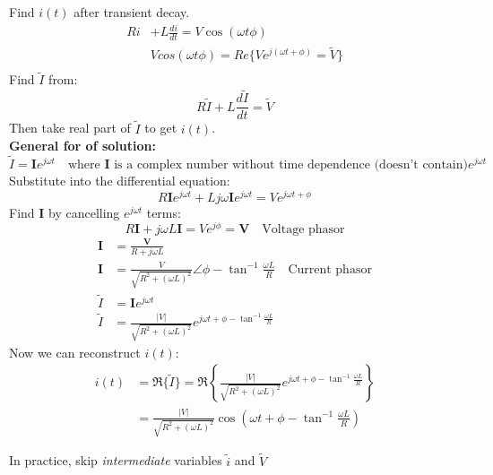 \begin{example}
    Find $i(t)$ after transient decay.\\
    \begin{align}
        Ri & + L\frac{di}{dt}= V \cos(\omega t \phi)                           \\
           & Vcos(\omega t \phi) = Re{\{Ve^{j(\omega t + \phi)} = \tilde{V}\}} \\
    \end{align}
    Find $\tilde{I}$ from:
    \[
        R \tilde{I} + L\frac{d\tilde{I}}{dt} = \tilde{V}
    \]
    Then take real part of $\tilde{I}$ to get $i(t)$.\\
    \textbf{General for of solution:}
    \[
        \tilde{I} = \textbf{I}e^{j\omega t} \quad \text{where } \textbf{I} \text{ is a complex number without time dependence (doesn't contain)} e^{j\omega t}
    \]
    Substitute into the differential equation:
    \[
        R\textbf{I}e^{j\omega t} + Lj\omega \textbf{I}e^{j\omega t} = Ve^{j\omega t + \phi}
    \]
    Find $\textbf{I}$ by cancelling $e^{j\omega t}$ terms:
    \[
        R \textbf{I} + j\omega L \textbf{I}= Ve^{j\phi} = \textbf{V} \quad \text{Voltage phasor}
    \]
    \begin{align}
        \textbf{I} & = \frac{\textbf{V}}{R + j\omega L}                                                                            \\
        \textbf{I} & = \frac{V}{\sqrt{R^2 + (\omega L)^2}}\angle{\phi - \tan^{-1} \frac{\omega L}{R}} \quad  \text{Current phasor} \\
        \tilde{I}  & = \textbf{I}e^{j\omega t}                                                                                     \\
        \tilde{I}  & = \frac{|V|}{\sqrt{R^2 + (\omega L)^2}}e^{j\omega t + \phi - \tan^{-1} \frac{\omega L}{R}}
    \end{align}
    Now we can reconstruct $i(t)$:
    \begin{align}
        i(t) & = \Re\{\tilde{I}\} = \Re\left\{\frac{|V|}{\sqrt{R^2 + (\omega L)^2}}e^{j\omega t + \phi - \tan^{-1} \frac{\omega L}{R}}\right\} \\
             & = \frac{|V|}{\sqrt{R^2 + (\omega L)^2}}\cos(\omega t + \phi - \tan^{-1} \frac{\omega L}{R})
    \end{align}
\end{example}

\begin{remark}
    In practice, skip \textit{intermediate} variables $\tilde{i}$ and $\tilde{V}$
\end{remark}

